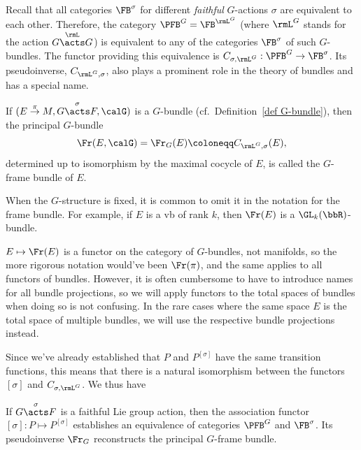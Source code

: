 Recall that all categories $\FB^\sigma$ for different \emph{faithful} $G$-actions $\sigma$ are equivalent to each other. Therefore, the category $\PFB^G=\FB^{\rmL^G}$ (where $\rmL^G$ stands for the action $G\overset{\rmL}{\acts}G$) is equivalent to any of the categories $\FB^\sigma$ of such $G$-bundles. The functor providing this equivalence is $C_{\sigma,\rmL^G}:\PFB^G\to \FB^\sigma$. Its pseudoinverse, $C_{\rmL^G,\sigma}$, also plays a prominent role in the theory of bundles and has a special name.

\begin{defn}
    If $(E\overset{\pi}{\to}M,G\overset{\sigma}{\acts}F,\calG)$ is a $G$-bundle (cf.\ Definition~\ref{def G-bundle}), then the principal $G$-bundle 
    \[\Fr(E,\calG)=\Fr_G(E)\coloneqq C_{\rmL^G, \sigma}(E),\] 
    determined up to isomorphism by the maximal cocycle of $E$, is called the $G$-frame bundle of $E$.
\end{defn}

\begin{rem}
    When the $G$-structure is fixed, it is common to omit it in the notation for the frame bundle. For example, if $E$ is a \gls{vb} of rank $k$, then $\Fr(E)$ is a $\GL_k(\bbR)$-bundle.

    $E\mapsto \Fr(E)$ is a functor on the category of $G$-bundles, not manifolds, so the more rigorous notation would've been $\Fr(\pi)$, and the same applies to all functors of bundles. However, it is often cumbersome to have to introduce names for all bundle projections, so we will apply functors to the total spaces of bundles when doing so is not confusing. In the rare cases where the same space $E$ is the total space of multiple bundles, we will use the respective bundle projections instead.
\end{rem}

Since we've already established that $P$ and $P^{[\sigma]}$ have the same transition functions, this means that there is a natural isomorphism between the functors $[\sigma]$ and $C_{\sigma, \rmL^G}$. We thus have
\begin{prop}
    If $G\overset{\sigma}{\acts}F$ is a faithful Lie group action, then the association functor $[\sigma]:P\mapsto P^{[\sigma]}$ establishes an equivalence of categories $\PFB^G$ and $\FB^\sigma$. Its pseudoinverse $\Fr_G$ reconstructs the principal $G$-frame bundle.
\end{prop}

